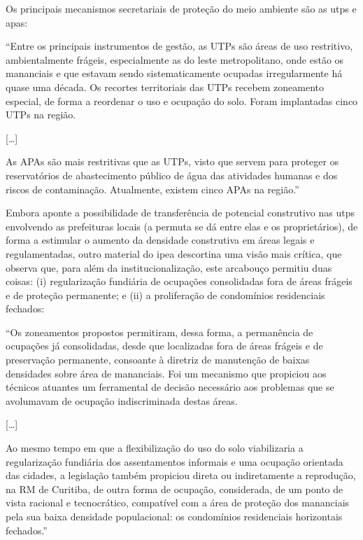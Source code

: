 	Os principais mecanismos secretariais de proteção do meio ambiente são as \gls{utp}s e \gls{apa}s:
	
	\begin{citacao}
		``Entre os principais instrumentos de gestão, as UTPs são áreas de uso restritivo, ambientalmente frágeis, especialmente as do leste metropolitano, onde estão os mananciais e que estavam sendo sistematicamente ocupadas irregularmente há quase uma década. Os recortes territoriais das UTPs recebem zoneamento especial, de forma a reordenar o uso e ocupação do solo. Foram implantadas cinco UTPs na região.
		
		[\dots]
		
		As APAs são mais restritivas que as UTPs, visto que servem para proteger os reservatórios de abastecimento público de água das atividades humanas e dos riscos de contaminação. Atualmente, existem cinco APAs na região.'' \cite[p. 30--31]{costa2015a}
	\end{citacao}

	Embora  aponte a possibilidade de transferência de potencial construtivo nas \gls{utp}s envolvendo as prefeituras locais (a permuta se dá entre elas e os proprietários), de forma a estimular o aumento da densidade construtiva em áreas legais e regulamentadas, outro material do \gls{ipea} descortina uma visão mais crítica, que observa que, para além da institucionalização, este arcabouço permitiu duas coisas: (i) regularização fundiária de ocupações consolidadas fora de áreas frágeis e de proteção permanente; e (ii) a proliferação de condomínios residenciais fechados:
	
	\begin{citacao}
		``Os zoneamentos propostos permitiram, dessa forma, a permanência de ocupações já consolidadas, desde que localizadas fora de áreas frágeis e de preservação permanente, consoante à diretriz de manutenção de baixas densidades sobre área de mananciais. Foi um mecanismo que propiciou aos técnicos atuantes um ferramental de decisão necessário aos problemas que se avolumavam de ocupação indiscriminada destas áreas.
		
		[\dots]
		
		Ao mesmo tempo em que a flexibilização do uso do solo viabilizaria a regularização fundiária dos assentamentos informais e uma ocupação orientada das cidades, a legislação também propiciou direta ou indiretamente a reprodução, na RM de Curitiba, de outra forma de ocupação, considerada, de um ponto de vista racional e tecnocrático, compatível com a área de proteção dos mananciais pela sua baixa densidade populacional: os condomínios residenciais horizontais fechados.'' \cite[p. 119]{nagamine2014a}
	\end{citacao}
	
